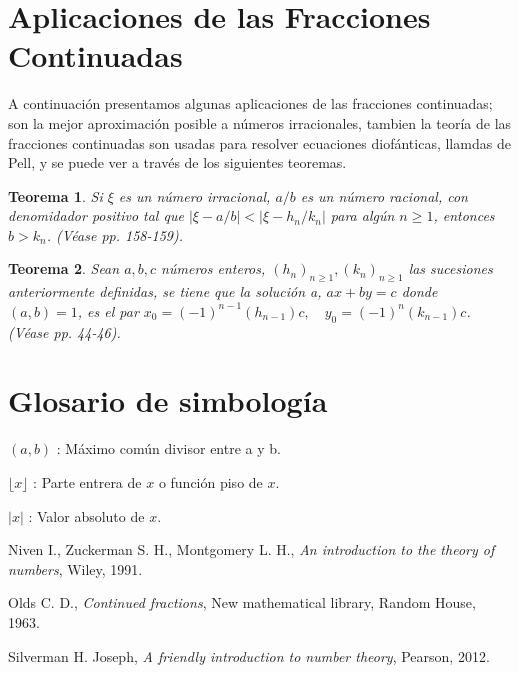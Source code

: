 \documentclass[11pt, article]{article}
\newtheorem{theorem}{Teorema} %
\begin{document}
    \section*{Aplicaciones de las Fracciones Continuadas}
     A continuación presentamos algunas aplicaciones de las fracciones continuadas; son la mejor aproximación posible a números irracionales, tambien la teoría de las fracciones continuadas son usadas para resolver ecuaciones diofánticas, llamdas de Pell, y se puede ver a través de los siguientes teoremas.
     
     \begin{theorem}
         Si $\xi$ es un número irracional, $a/b$ es un número racional, con denomidador positivo tal que $|\xi - a/b|<|\xi-h_n/k_n|$ para algún $n\geq 1$, entonces $b>k_n$. \textnormal{(Véase \cite{Niven} pp. 158-159)}.
     \end{theorem}
     
    \begin{theorem}
        Sean  $a,b,c$ números enteros, $(h_n)_{n\geq 1}, (k_n)_{n\geq 1}$ las sucesiones anteriormente definidas, se tiene que la solución a, $ax+by=c$ donde $(a,b)=1$, es el par $x_0 = (-1)^{n-1} (h_{n-1})c,\quad y_0=(-1)^n (k_{n-1})c$. \textnormal{(Véase \cite{Olds} pp. 44-46)}.

     
    \end{theorem} 
    
     \section*{Glosario de simbología}
     
     $(a,b)$ : Máximo común divisor entre a y b.
     
     $\lfloor x \rfloor$ : Parte entrera  de $x$ o función piso de $x$.
     
     $|x|$ : Valor absoluto de $x$.
    \begin{comment}
        \section{Referencias}
    \end{comment}
     \begin{thebibliography}{9}
     
         Niven I., Zuckerman S. H., Montgomery L. H., \textit{An introduction to the theory of numbers}, Wiley, 1991.
    
         Olds C. D., \textit{Continued fractions}, New mathematical library, Random House, 1963.
     
         Silverman H. Joseph, \textit{A friendly introduction to number theory}, Pearson, 2012.
    \end{thebibliography}
\end{document}

